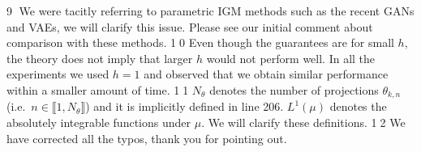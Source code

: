 \documentclass{article}
\newcommand{\rev}[1]{{\color{red} #1}}
\newcommand{\umut}[1]{{\color{blue} #1}}
\newcommand{\alain}[1]{{\color{cyan} #1}}
\newcommand{\antoine}[1]{{\color{orange} #1}}
\newcommand{\ubul}[1]{{\large \color{red} \textcircled{\small #1}}}
\begin{document}
%
%
\ubul{9} We were tacitly referring to parametric IGM methods such as the recent GANs and VAEs, we will clarify this issue. Please see our initial comment about comparison with these methods.
%
%
\ubul{10} Even though the guarantees are for small $h$, the theory does not imply that larger $h$ would not perform well. In all the experiments we used $h=1$ and observed that we obtain similar performance within a smaller amount of time.
%
\ubul{11} $N_\theta$ denotes the number of projections $\theta_{k,n}$ (i.e.\ $n \in \llbracket 1, N_\theta \rrbracket$) and it is implicitly defined in line 206. $L^1(\mu)$ denotes the absolutely integrable functions under $\mu$. We will clarify these definitions.
%
%
\ubul{12} We have corrected all the typos, thank you for pointing out.
\end{document}
